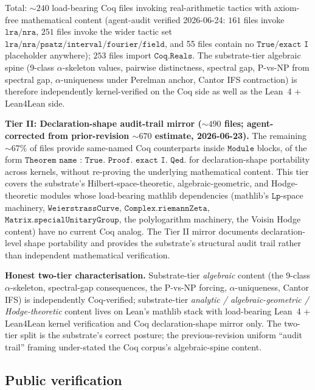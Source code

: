 \documentclass[11pt,a4paper]{amsart}
\theoremstyle{plain}
\theoremstyle{definition}
\begin{document}
Total: $\sim 240$ load-bearing Coq files invoking real-arithmetic tactics with axiom-free mathematical content (agent-audit verified 2026-06-24: $161$ files invoke $\texttt{lra}/\texttt{nra}$, $251$ files invoke the wider tactic set $\texttt{lra}/\texttt{nra}/\texttt{psatz}/\texttt{interval}/\texttt{fourier}/\texttt{field}$, and 55 files contain no $\texttt{True}/\texttt{exact I}$ placeholder anywhere); $253$ files import $\texttt{Coq.Reals}$. The substrate-tier algebraic spine (9-class $\alpha$-skeleton values, pairwise distinctness, spectral gap, P-vs-NP from spectral gap, $\alpha$-uniqueness under Perelman anchor, Cantor IFS contraction) is therefore independently kernel-verified on the Coq side as well as the Lean~4 + Lean4Lean side.

\textbf{Tier II: Declaration-shape audit-trail mirror ($\sim 490$ files; agent-corrected from prior-revision $\sim 670$ estimate, 2026-06-23).} The remaining $\sim 67\%$ of files provide same-named Coq counterparts inside $\texttt{Module}$ blocks, of the form $\texttt{Theorem name : True. Proof. exact I. Qed.}$ for declaration-shape portability across kernels, without re-proving the underlying mathematical content. This tier covers the substrate's Hilbert-space-theoretic, algebraic-geometric, and Hodge-theoretic modules whose load-bearing mathlib dependencies (mathlib's $\texttt{Lp}$-space machinery, $\texttt{WeierstrassCurve}$, $\texttt{Complex.riemannZeta}$, $\texttt{Matrix.specialUnitaryGroup}$, the polylogarithm machinery, the Voisin Hodge content) have no current Coq analog. The Tier II mirror documents declaration-level shape portability and provides the substrate's structural audit trail rather than independent mathematical verification.

\textbf{Honest two-tier characterisation.} Substrate-tier \emph{algebraic} content (the 9-class $\alpha$-skeleton, spectral-gap consequences, the P-vs-NP forcing, $\alpha$-uniqueness, Cantor IFS) is independently Coq-verified; substrate-tier \emph{analytic / algebraic-geometric / Hodge-theoretic} content lives on Lean's mathlib stack with load-bearing Lean~4 + Lean4Lean kernel verification and Coq declaration-shape mirror only. The two-tier split is the substrate's correct posture; the previous-revision uniform ``audit trail'' framing under-stated the Coq corpus's algebraic-spine content.

\subsection{Public verification}
\end{document}
